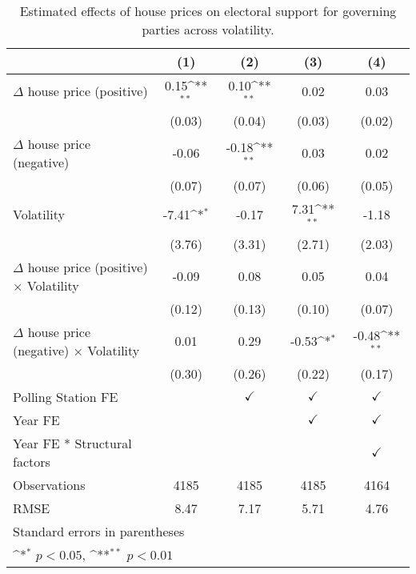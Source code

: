 \begin{table}[htbp]\centering
\def\sym#1{\ifmmode^{#1}\else\(^{#1}\)\fi}
\caption{Estimated effects of house prices on electoral support for governing parties across volatility.}
\begin{tabular}{l*{4}{c}}
\hline\hline
                    &\multicolumn{1}{c}{(1)}        &\multicolumn{1}{c}{(2)}        &\multicolumn{1}{c}{(3)}        &\multicolumn{1}{c}{(4)}        \\
\hline
$\Delta$ house price (positive)&        0.15\sym{**}&        0.10\sym{**}&        0.02        &        0.03        \\
                    &      (0.03)        &      (0.04)        &      (0.03)        &      (0.02)        \\
[1em]
$\Delta$ house price (negative)&       -0.06        &       -0.18\sym{**}&        0.03        &        0.02        \\
                    &      (0.07)        &      (0.07)        &      (0.06)        &      (0.05)        \\
[1em]
Volatility          &       -7.41\sym{*} &       -0.17        &        7.31\sym{**}&       -1.18        \\
                    &      (3.76)        &      (3.31)        &      (2.71)        &      (2.03)        \\
[1em]
$\Delta$ house price (positive) $\times$ Volatility&       -0.09        &        0.08        &        0.05        &        0.04        \\
                    &      (0.12)        &      (0.13)        &      (0.10)        &      (0.07)        \\
[1em]
$\Delta$ house price (negative) $\times$ Volatility&        0.01        &        0.29        &       -0.53\sym{*} &       -0.48\sym{**}\\
                    &      (0.30)        &      (0.26)        &      (0.22)        &      (0.17)        \\
[1em]
\hline Polling Station FE&                    &$\checkmark$        &$\checkmark$        &$\checkmark$        \\
[1em]
Year FE             &                    &                    &$\checkmark$        &$\checkmark$        \\
[1em]
Year FE * Structural factors&                    &                    &                    &$\checkmark$        \\
\hline
Observations        &        4185        &        4185        &        4185        &        4164        \\
RMSE                &        8.47        &        7.17        &        5.71        &        4.76        \\
\hline\hline
\multicolumn{5}{l}{\footnotesize Standard errors in parentheses}\\
\multicolumn{5}{l}{\footnotesize \sym{*} \(p<0.05\), \sym{**} \(p<0.01\)}\\
\end{tabular}
\end{table}
